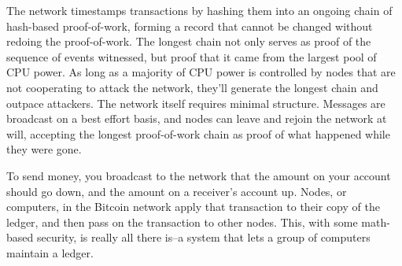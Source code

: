 The network timestamps transactions by hashing them into an ongoing chain of
hash-based proof-of-work, forming a record that cannot be changed without 
redoing the proof-of-work. The longest chain not only serves as proof of the 
sequence of events witnessed, but proof that it came from the largest pool of CPU 
power. As long as a majority of CPU power is controlled by nodes that are not 
cooperating to attack the network, they'll generate the longest chain and outpace 
attackers. The network itself requires minimal structure. Messages are broadcast on 
a best effort basis, and nodes can leave and rejoin the network at will, accepting the 
longest proof-of-work chain as proof of what happened while they were gone.

To send money, you broadcast to the network that the amount on your account 
should go down, and the amount on a receiver’s account up. Nodes, or computers,
in the Bitcoin network apply that transaction to their copy of the ledger, and then 
pass on the transaction to other nodes. This, with some math-based security, is 
really all there is--a system that lets a group of computers maintain a ledger.

%
%
%
\tableofcontents
%
%
%
%
\listoffigures
%
%
\mainmatter
%
%
